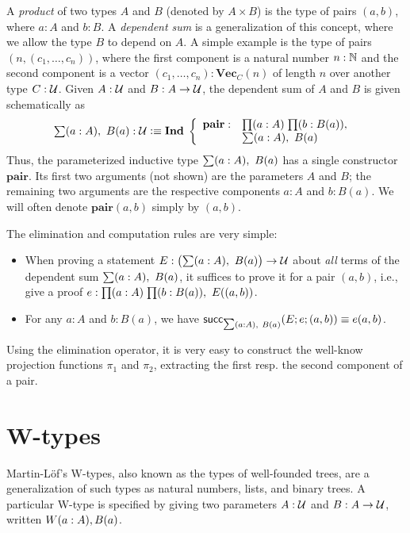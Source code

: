 A \emph{product} of two types $A$ and $B$ (denoted by $A \times B$) is the type of pairs $(a,b)$, where $a : A$ and $b : B$. A \emph{dependent sum} is a generalization of this concept, where we allow the type $B$ to depend on $A$. A simple example is the type of pairs $(n,(c_1,\ldots,c_n))$, where the first component is a natural number $n : \mathbb{N}$ and the second component is a vector $(c_1,\ldots,c_n) : \mathbf{Vec}_C(n)$ of length $n$ over another type $C : \mathcal{U}$.
Given $A : \mathcal{U}$ and $B : A \to \mathcal{U}$, the dependent sum of $A$ and $B$ is given schematically as
\[ \sm{a:A} B(a) : \type \defeq \ind \left\{
\begin{array}{ll}
\mathbf{pair} : & \prd{a:A}{b:B(a)} \\
& \sm{a:A} B(a)
\end{array}
\right. \]
Thus, the parameterized inductive type $\sm{a:A} B(a)$ has a single constructor $\mathbf{pair}$. Its first two arguments (not shown) are the parameters $A$ and $B$; the remaining two arguments are the respective components $a : A$ and $b : B(a)$. We will often denote $\mathbf{pair}(a,b)$ simply by $(a,b)$.

The elimination and computation rules are very simple:

\begin{itemize}
\item When proving a statement $E : \big(\sm{a:A} B(a)\big) \to \type$ about \emph{all} terms of the dependent sum $\sm{a:A} B(a)$, it suffices to prove it for a pair $(a,b)$, i.e., give a proof $e : \prd{a:A}{b:B(a)} E((a,b))$.
\end{itemize}

\begin{itemize}
\item For any $a : A$ and $b : B(a)$, we have $\rec_{\sm{a:A} B(a)}(E;e;(a,b)) \equiv e(a,b)$.
\end{itemize}
Using the elimination operator, it is very easy to construct the well-know projection functions $\pi_1$ and $\pi_2$, extracting the first resp. the second component of a pair.


\section{W-types}
Martin-L{\"o}f's W-types, also known as the types of well-founded trees, are a generalization of such types as natural numbers, lists, and binary trees. A particular W-type is specified by giving two parameters $A : \mathcal{U}$ and $B : A \to \mathcal{U}$, written $W(a:A), B(a)$.

